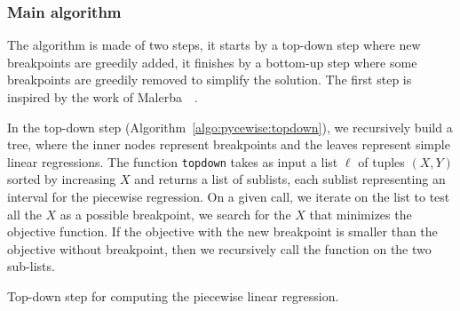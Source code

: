             \subsubsection{Main algorithm}%

                The algorithm is made of two steps, it starts by a top-down step where new breakpoints are
                greedily added, it finishes by a bottom-up step where some breakpoints are greedily removed to simplify
                the solution. The first step is inspired by the work of Malerba~\etal~\cite{Malerba_2004}.

                In the top-down step (Algorithm~\ref{algo:pycewise:topdown}), we recursively build a tree, where the inner
                nodes represent breakpoints and the leaves represent simple linear regressions. The function
                \texttt{topdown} takes as input a list \(\ell\) of tuples \((X,Y)\) sorted by increasing \(X\) and
                returns a list of sublists, each sublist representing an interval for the piecewise regression. On a
                given call, we iterate on the list to test all the \(X\) as a possible breakpoint, we search for the
                \(X\) that minimizes the objective function.  If the objective with the new breakpoint is smaller than
                the objective without breakpoint, then we recursively call the function on the two sub-lists.
                \begin{algorithm}
                    \DontPrintSemicolon
                    \caption{Top-down step for computing the piecewise linear regression.}
                    \label{algo:pycewise:topdown}
                \end{algorithm}

